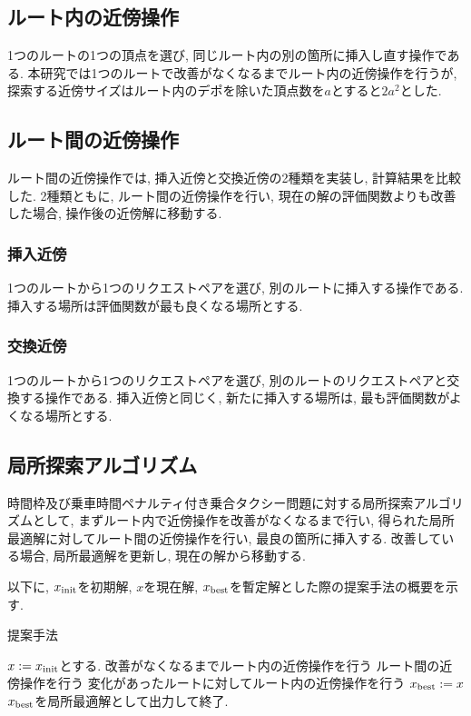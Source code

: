\subsection{ルート内の近傍操作}
1つのルートの1つの頂点を選び, 同じルート内の別の箇所に挿入し直す操作である. 本研究では1つのルートで改善がなくなるまでルート内の近傍操作を行うが, 探索する近傍サイズはルート内のデポを除いた頂点数を$a$とすると$2a^2$とした.

\subsection{ルート間の近傍操作}
ルート間の近傍操作では, 挿入近傍と交換近傍の2種類を実装し, 計算結果を比較した. 2種類ともに, ルート間の近傍操作を行い, 現在の解の評価関数よりも改善した場合, 操作後の近傍解に移動する.
\subsubsection{挿入近傍}
1つのルートから1つのリクエストペアを選び, 別のルートに挿入する操作である. 挿入する場所は評価関数が最も良くなる場所とする.
\subsubsection{交換近傍}
1つのルートから1つのリクエストペアを選び, 別のルートのリクエストペアと交換する操作である. 挿入近傍と同じく, 新たに挿入する場所は, 最も評価関数がよくなる場所とする.
\subsection{局所探索アルゴリズム}
時間枠及び乗車時間ペナルティ付き乗合タクシー問題に対する局所探索アルゴリズムとして, まずルート内で近傍操作を改善がなくなるまで行い, 得られた局所最適解に対してルート間の近傍操作を行い, 最良の箇所に挿入する. 改善している場合, 局所最適解を更新し, 現在の解から移動する.

以下に, $x_{\rm init}$を初期解, $x$を現在解, $x_{\rm best}$を暫定解とした際の提案手法の概要を示す.
\begin{algorithm}
 \caption{提案手法}
 \label{algo1}
 \begin{algorithmic}[1]%
  \STATE $x := x_{\rm init}$とする.
  \STATE 改善がなくなるまでルート内の近傍操作を行う
  \STATE ルート間の近傍操作を行う
  \STATE 変化があったルートに対してルート内の近傍操作を行う
  \STATE  $x_{\rm best} := x$
  \ENDIF
  \STATE $x_{\rm best}$を局所最適解として出力して終了. 
 \end{algorithmic}
\end{algorithm}
